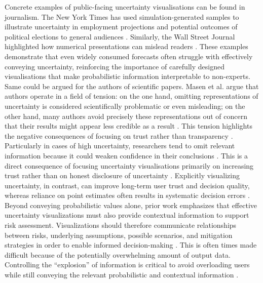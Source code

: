 \documentclass[final,journal,a4paper]{IEEEtran}
\begin{document}
Concrete examples of public-facing uncertainty visualisations can be found in journalism. The New York Times has used simulation-generated samples to illustrate uncertainty in employment projections and potential outcomes of political elections to general audiences \cite{nytimes, nytimes-whowillwin}. Similarly, the Wall Street Journal highlighted how numerical presentations can mislead readers \cite{Ellenberg2015}. These examples demonstrate that even widely consumed forecasts often struggle with effectively conveying uncertainty, reinforcing the importance of carefully designed visualisations that make probabilistic information interpretable to non-experts. Same could be argued for the authors of scientific papers. Masen et al. \cite{Mason2024} argue that authors operate in a field of tension: on the one hand, omitting representations of uncertainty is considered scientifically problematic or even misleading; on the other hand, many authors avoid precisely these representations out of concern that their results might appear less credible as a result \cite{Mason2024}. This tension highlights the negative consequences of focusing on trust rather than transparency \cite{Mason2024}. Particularly in cases of high uncertainty, researchers tend to omit relevant information because it could weaken confidence in their conclusions \cite{Mason2024}. This is a direct consequence of focusing uncertainty visualisations primarily on increasing trust rather than on honest disclosure of uncertainty \cite{Mason2024}.
\newline
Explicitly visualizing uncertainty, in contrast, can improve long-term user trust and decision quality, whereas reliance on point estimates often results in systematic decision errors \cite{Kay2016}. Beyond conveying probabilistic values alone, prior work emphasizes that effective uncertainty visualizations must also provide contextual information to support risk assessment. Visualizations should therefore communicate relationships between risks, underlying assumptions, possible scenarios, and mitigation strategies in order to enable informed decision-making \cite{Dikmen2024}. This is often times made difficult because of the potentially overwhelming amount of output data. Controlling the ``explosion'' of information is critical to avoid overloading users while still conveying the relevant probabilistic and contextual information \cite{GrietheSchumann}. %
\end{document}
